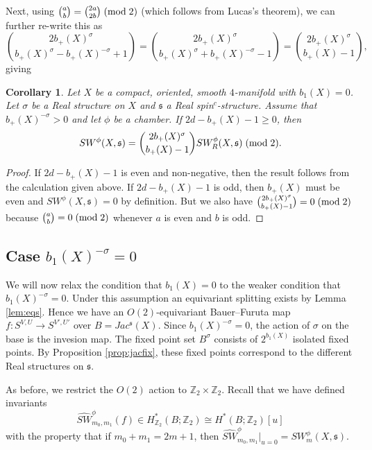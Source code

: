 \documentclass{amsart}
\newtheorem{corollary}[theorem]{Corollary}
\theoremstyle{definition}
\theoremstyle{remark}
\numberwithin{equation}{section}
\begin{document}
Next, using $\binom{a}{b} = \binom{2a}{2b} \; ({\rm mod} \; 2)$ (which follows from Lucas's theorem), we can further re-write this as
\[
\binom{ 2b_+(X)^\sigma}{ b_+(X)^{\sigma} - b_+(X)^{-\sigma} + 1} = \binom{ 2b_+(X)^\sigma }{ b_+(X)^\sigma + b_+(X)^{-\sigma} - 1 } = \binom{2b_+(X)^\sigma}{ b_+(X) - 1},
\]
giving
\begin{corollary}
Let $X$ be a compact, oriented, smooth $4$-manifold with $b_1(X) = 0$. Let $\sigma$ be a Real structure on $X$ and $\mathfrak{s}$ a Real spin$^c$-structure. Assume that $b_+(X)^{-\sigma}>0$ and let $\phi$ be a chamber. If $2d - b_+(X) - 1 \ge 0$, then
\[
SW^\phi(X,\mathfrak{s}) = \binom{ 2b_+(X)^{\sigma} }{ b_+(X)-1 } SW^\phi_R(X,\mathfrak{s}) \; ({\rm mod} \; 2).
\]
\end{corollary}
\begin{proof}
If $2d - b_+(X) - 1$ is even and non-negative, then the result follows from the calculation given above. If $2d - b_+(X) - 1$ is odd, then $b_+(X)$ must be even and $SW^\phi(X,\mathfrak{s}) = 0$ by definition. But we also have $\binom{ 2b_+(X)^{\sigma} }{b_+(X) - 1} = 0 \; ({\rm mod} \; 2)$ because $\binom{a}{b} = 0 \; ({\rm mod} \; 2)$ whenever $a$ is even and $b$ is odd.
\end{proof}

\subsection{Case $b_1(X)^{-\sigma}=0$}\label{sec:loc3}

We will now relax the condition that $b_1(X) = 0$ to the weaker condition that $b_1(X)^{-\sigma} = 0$. Under this assumption an equivariant splitting exists by Lemma \ref{lem:eqs}. Hence we have an $O(2)$-equivariant Bauer--Furuta map $f : S^{V,U} \to S^{V',U'}$ over $B = Jac^{\mathfrak{s}}(X)$. Since $b_1(X)^{-\sigma} = 0$, the action of $\sigma$ on the base is the invesion map. The fixed point set $B^\sigma$ consists of $2^{b_1(X)}$ isolated fixed points. By Proposition \ref{prop:jacfix}, these fixed points correspond to the different Real structures on $\mathfrak{s}$.

As before, we restrict the $O(2)$ action to $\mathbb{Z}_2 \times \mathbb{Z}_2$. Recall that we have defined invariants
\[
\widehat{SW}^\phi_{m_0,m_1}(f) \in H^*_{\mathbb{Z}_2}( B ; \mathbb{Z}_2) \cong H^*(B ; \mathbb{Z}_2)[u]
\]
with the property that if $m_0 + m_1 = 2m+1$, then $\widehat{SW}^\phi_{m_0,m_1}|_{u=0} = SW^\phi_m(X,\mathfrak{s})$.
\end{document}
